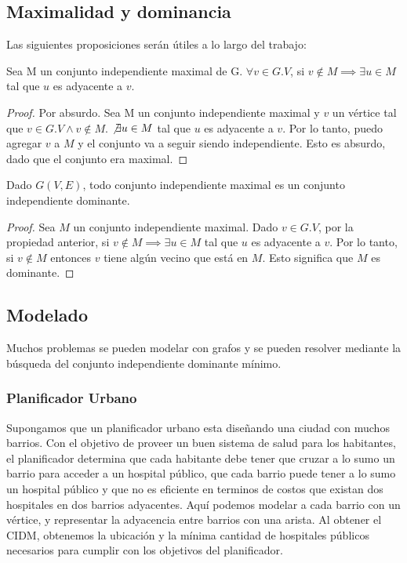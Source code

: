 \subsection{Maximalidad y dominancia}

Las siguientes proposiciones serán útiles a lo largo del trabajo:

\begin{proposition}
Sea M un conjunto independiente maximal de G. $\forall v \in G.V$, si $v \notin M \implies \exists u \in M$ tal que $u$ es adyacente a $v$. 
\end{proposition}

\begin{proof}
Por absurdo. Sea M un conjunto independiente maximal y $v$ un vértice tal que $v \in G.V \land v \notin M$. $\not\exists u \in M$ tal que $u$ es adyacente a $v$. Por lo tanto, puedo agregar $v$ a $M$ y el conjunto va a seguir siendo independiente. Esto es absurdo, dado que el conjunto era maximal.
\end{proof}

\begin{proposition}
Dado $G(V,E)$, todo conjunto independiente maximal es un conjunto independiente dominante.
\end{proposition}

\begin{proof}
Sea $M$ un conjunto independiente maximal. Dado $v \in G.V$, por la propiedad anterior, si $v \notin M \implies \exists u \in M$ tal que $u$ es adyacente a $v$. Por lo tanto, si $v \notin M$ entonces $v$ tiene algún vecino que está en $M$. Esto significa que $M$ es dominante.
\end{proof}

\subsection{Modelado}
Muchos problemas se pueden modelar con grafos y se pueden resolver mediante la búsqueda del conjunto independiente dominante mínimo.

\subsubsection{Planificador Urbano}

Supongamos que un planificador urbano esta diseñando una ciudad con muchos barrios. Con el objetivo de proveer un buen sistema de salud para los habitantes, el planificador determina que cada habitante debe tener que cruzar a lo sumo un barrio para acceder a un hospital público, que cada barrio puede tener a lo sumo un hospital público y que no es eficiente en terminos de costos que existan dos hospitales en dos barrios adyacentes. Aquí podemos modelar a cada barrio con un vértice, y representar la adyacencia entre barrios con una arista. Al obtener el CIDM, obtenemos la ubicación y la mínima cantidad de hospitales públicos necesarios para cumplir con los objetivos del planificador.

